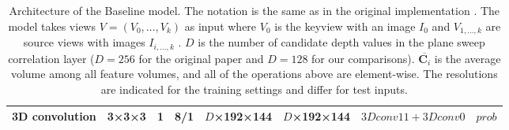 \begin{table}[htbp]
\begin{adjustbox}{width=1\textwidth}
\begin{tabular}{|l|c|c|c|c|c|c|c|}
3D convolution                             & 3×3×3             & 1               & 8/1           & $D$×192×144           & $D$×192×144           & $3Dconv11+3Dconv0$             & $prob$           \\ \hline
\end{tabular}
\end{adjustbox}
\caption[Architecture of the {\mvsn} Baseline model.]{Architecture of the {\mvsn} Baseline model.
The notation is the same as in the original {\mvsn} implementation \cite{Yao2018}. The model takes views $V = (V_0 , \dots , V_k )$ as input where $V_0$ is the keyview with an image $I_0$ and $V_{1,\dots,k}$ are source views with images $I_{i,\dots,k}$ . $D$ is the number of candidate depth values in the plane sweep correlation layer ($D=256$ for the original paper and $D=128$ for our comparisons). $\overbar{\mathbf{C}_i}$ is the average volume among all feature volumes, and all of the operations above are element-wise\cite{Yao2018}. The resolutions are indicated for the training settings and differ for test inputs.}
\label{tab:arch-mvsn}
\end{table}
